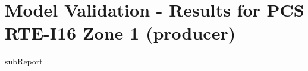 




    \section{Model Validation - Results for PCS RTE-I16 Zone 1 ({{producer}})}

    {{subReport}}
    \newpage

